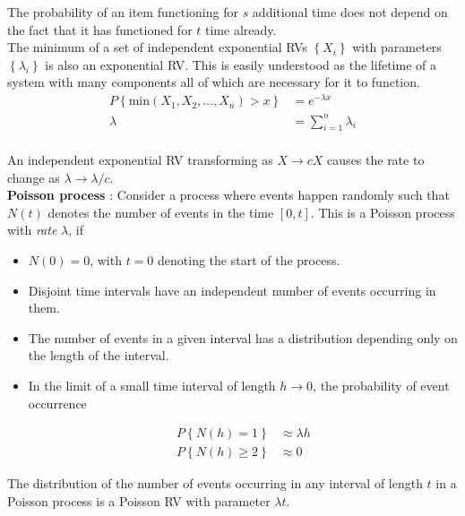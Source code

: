 The probability of an item functioning for $ s $ additional time does not depend on the fact that it has functioned for $ t $ time already.\\

The minimum of a set of independent exponential RVs $ \left\{X_i\right\} $ with parameters $ \left\{\lambda_i\right\} $ is also an exponential RV. This is easily understood as the lifetime of a system with many components all of which are necessary for it to function. \\

\begin{align}
	P \left\{\mathrm{min}(X_1, X_2, \dots, X_n) > x\right\} &= e^{-\lambda x} \nonumber \\[1ex]
	\lambda &= \sum_{i=1}^{n} \lambda_i
\end{align} \\

An independent exponential RV transforming as $ X \to cX $ causes the rate to change as $ \lambda \to \lambda/c $.\\

\textbf{Poisson process} : Consider a process where events happen randomly such that $ N(t) $ denotes the number of events in the time $ [0, t] $. This is a Poisson process with \textit{rate} $ \lambda $, if\\

\begin{itemize}
	\item $ N(0) = 0 $, with $ t = 0 $ denoting the start of the process.
	
	\item Disjoint time intervals have an independent number of events occurring in them.
	
	\item The number of events in a given interval has a distribution depending only on the length of the interval.
	
	\item In the limit of a small time interval of length $ h \to 0 $, the probability of event occurrence
	
	\begin{align}
		P \left\{N(h) = 1\right\} &\approx \lambda h \nonumber \\[1ex]
		P \left\{N(h) \geq 2\right\} &\approx 0
	\end{align}
\end{itemize}

The distribution of the number of events occurring in any interval of length $ t $ in a Poisson process is a Poisson RV with parameter $ \lambda t $.\\


